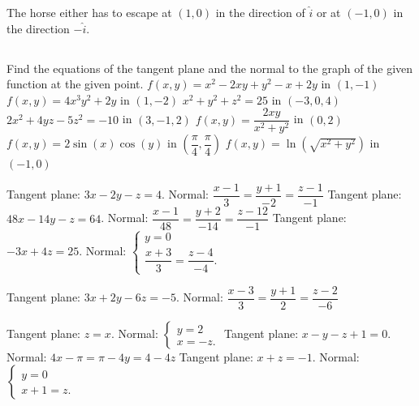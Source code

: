 \begin{Answer}
The horse either has to escape at $(1,0)$ in the direction of $\hat{i}$ or at $(-1,0)$ in the direction $-\hat{i}$.
\end{Answer}
\fi

\subsection*{}

\begin{Exercise} Find the equations of the tangent plane and the normal to the graph of the given function at the given point. 
    \Question[difficulty=1] $f(x,y)=x^2 - 2xy+y^2-x+2y$ \qquad in \quad $(1,-1)$ %
    \ifcalculus\Question[difficulty=1] $f(x,y) = 4x^3y^2+2y$ \qquad in \quad $(1,-2) $
    \Question[difficulty=1] $x^2 + y^2 + z^2 = 25$ \qquad in \quad $(-3,0,4)$\fi
    \Question[difficulty=1] $2x^2 + 4yz-5z^2 = -10$ \qquad in \quad $(3,-1,2)$%
    \Question[difficulty=2] $f(x,y) = \dfrac{2xy}{x^2+y^2}$ \qquad in \quad $(0,2) $  %
    \Question[difficulty=2] $f(x,y) = 2 \sin(x) \cos(y)$ \qquad in \quad $\left(\dfrac{\pi}{4},\dfrac{\pi}{4} \right)$%
    \ifcalculus\Question[difficulty=2] $f(x,y) = \ln\left(\sqrt{x^2+y^2}\right)$ \qquad in \quad $(-1,0)$\fi
\end{Exercise}

\begin{Answer}
    
        \Question Tangent plane: $3x-2y-z = 4$. Normal: $\dfrac{x-1}{3} = \dfrac{y+1}{-2} = \dfrac{z-1}{-1}$
        \ifcalculus
        \Question Tangent plane: $48x-14y-z = 64$. Normal: $\dfrac{x-1}{48} = \dfrac{y+2}{-14} = \dfrac{z-12}{-1}$
        \Question Tangent plane: $-3x+4z = 25$. Normal: $\left\{ \begin{array}{l} y=0 \\ \dfrac{x+3}{3} = \dfrac{z-4}{-4}. \end{array} \right.$
        \fi
         
        \Question Tangent plane: $3x+2y-6z = -5$. Normal: $\dfrac{x-3}{3} = \dfrac{y+1}{2} = \dfrac{z-2}{-6}$ 
        
        \Question Tangent plane: $z=x$. Normal: $\left\{ \begin{array}{l} y=2 \\ x=-z. \end{array} \right.$
        \Question Tangent plane: $x-y-z+1 = 0$. Normal: $4x- \pi = \pi - 4y = 4 - 4z$ 
        \ifcalculus
        \Question  Tangent plane: $x+z = -1$. Normal: $\left\{ \begin{array}{l} y=0 \\ x+1=z. \end{array} \right.$
        \fi
    

\end{Answer}

